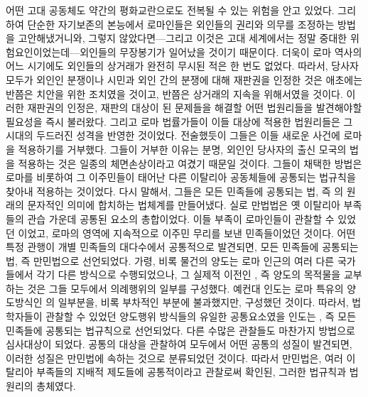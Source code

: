 어떤 고대 공동체도 약간의 평화교란으로도 전복될 수 있는 위험을 안고 있었다.
그리하여 단순한 자기보존의 본능에서 로마인들은
외인들의 권리와 의무를 조정하는 방법을 고안해냈거니와,
그렇지 않았다면---그리고 이것은 고대 세계에서는
정말 중대한 위험요인이었는데---외인들의 무장봉기가 일어났을 것이기 때문이다.
더욱이 로마 역사의 어느 시기에도 외인들의 상거래가 완전히 무시된 적은
한 번도 없었다.
따라서,
당사자 모두가 외인인 분쟁이나 시민과 외인 간의 분쟁에 대해
재판권을 인정한 것은 애초에는
반쯤은 치안을 위한 조치였을 것이고, 반쯤은 상거래의 지속을 위해서였을 것이다.
이러한 재판권의 인정은, 재판의 대상이 된 문제들을 해결할 어떤 법원리들을
발견해야할 필요성을 즉시 불러왔다. 그리고
로마 법률가들이 이들 대상에 적용한 법원리들은 그 시대의
두드러진 성격을 반영한 것이었다.
전술했듯이 그들은 이들 새로운 사건에 로마 을 적용하기를 거부했다.
그들이 거부한 이유는 분명, 외인인 당사자의 출신 모국의 법을 적용하는 것은
일종의 체면손상이라고 여겼기 때문일 것이다.
그들이 채택한 방법은 로마를 비롯하여
그 이주민들이 태어난 다른 이탈리아 공동체들에
공통되는 법규칙을 찾아내 적용하는 것이었다.
다시 말해서, 그들은
모든 민족들에 공통되는 법, 즉 의 원래의
문자적인 의미에 합치하는 법체계를 만들어냈다.
실로 만법법은 옛 이탈리아 부족들의 관습 가운데 공통된 요소의 총합이었다.
이들 부족이 로마인들이 관찰할 수 있었던 이었고,
로마의 영역에 지속적으로 이주민 무리를 보낸 민족들이었던 것이다.
어떤 특정 관행이 개별 민족들의 대다수에서 공통적으로 발견되면,
모든 민족들에 공통되는 법, 즉 만민법으로 선언되었다.
가령,
비록 물건의 양도는 로마 인근의 여러 다른 국가들에서 각기 다른 방식으로
수행되었으나, 그 실제적 이전인 , 즉
양도의 목적물을 교부하는 것은 그들 모두에서 의례행위의 일부를 구성했다.
예컨대 인도는 로마 특유의 양도방식인
의 일부분을, 비록
부차적인 부분에 불과했지만, 구성했던 것이다.
따라서,
법학자들이 관찰할 수 있었던 양도행위 방식들의 유일한
공통요소였을 인도는
, 즉 모든 민족들에 공통되는 법규칙으로 선언되었다.
다른 수많은 관찰들도 마찬가지 방법으로 심사대상이 되었다.
공통의 대상을 관찰하여 모두에서
어떤 공통의 성질이 발견되면,
이러한 성질은 만민법에 속하는 것으로 분류되었던 것이다.
따라서 만민법은,
여러 이탈리아 부족들의 지배적 제도들에 공통적이라고
관찰로써 확인된,
그러한 법규칙과 법원리의 총체였다.


